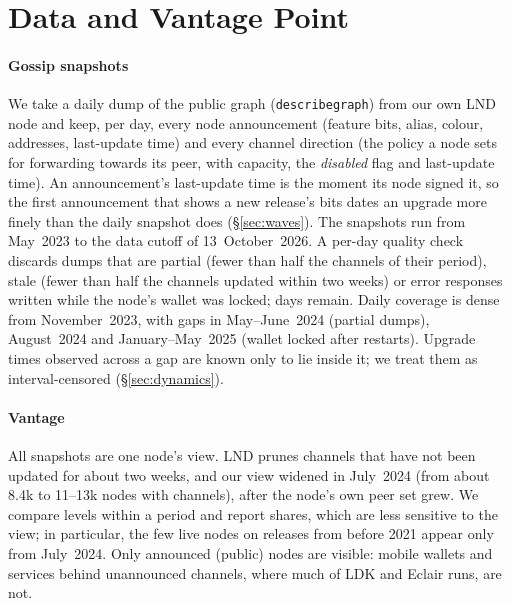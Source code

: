 \section{Data and Vantage Point}
\label{sec:data}

\paragraph{Gossip snapshots}
We take a daily dump of the public graph (\texttt{describegraph}) from our own LND node and keep, per day, every
node announcement (feature bits, alias, colour, addresses, last-update time) and every channel direction (the policy
a node sets for forwarding towards its peer, with capacity, the \emph{disabled} flag and last-update time). An
announcement's last-update time is the moment its node signed it, so the first announcement that shows a new release's
bits dates an upgrade more finely than the daily snapshot does (\S\ref{sec:waves}). The snapshots run from May~2023
to the data cutoff of 13~October~2026. A per-day quality check discards dumps that
are partial (fewer than half the channels of their period), stale (fewer than half the channels updated within two
weeks) or error responses written while the node's wallet was locked; \DataUsableDays{} days remain. Daily coverage is
dense from November~2023, with gaps in May--June~2024 (partial dumps), August~2024 and January--May~2025 (wallet
locked after restarts). Upgrade times observed across a gap are known only to lie inside it; we treat them as
interval-censored (\S\ref{sec:dynamics}).

\paragraph{Vantage}
All snapshots are one node's view. LND prunes channels that have not been updated for about two weeks, and our
view widened in July~2024 (from about 8.4k to 11--13k nodes with channels), after the node's own peer set grew. We
compare levels within a period and report shares, which are less sensitive to the view; in particular, the few
live nodes on releases from before 2021 appear only from July~2024. Only announced (public) nodes are visible:
mobile wallets and services behind unannounced channels, where much of LDK and Eclair runs, are not.

